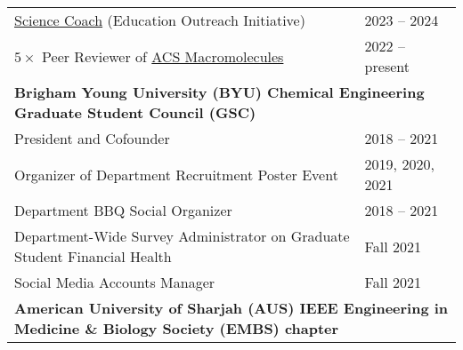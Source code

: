 \documentclass[letterpaper,11pt]{article}
\begin{document}
\begin{longtable}{@{}p{}l@{}}
  \hspace{3mm} \href{https://www.acs.org/education/outreach/science-coaches.html}{Science Coach} (Education Outreach Initiative)                                                                                  & 2023 -- 2024     \\
  \hspace{3mm} $5\times$ Peer Reviewer of \href{https://pubs.acs.org/journal/mamobx}{ACS Macromolecules}                                                                                                          & 2022 -- present  \\ [4pt]
  \multicolumn{2}{l}{\hspace{-3mm} \bf{Brigham Young University (BYU) Chemical Engineering Graduate Student Council (GSC)}}                                                                                                          \\
  \hspace{3mm} President and Cofounder                                                                                                                                                                            & 2018 -- 2021     \\
  \hspace{3mm} Organizer of Department Recruitment Poster Event                                                                                                                                                   & 2019, 2020, 2021 \\
  \hspace{3mm} Department BBQ Social Organizer                                                                                                                                                                    & 2018 -- 2021     \\
  \hspace{3mm} Department-Wide Survey Administrator on Graduate Student Financial Health                                                                                                                          & Fall 2021        \\
  \hspace{3mm} Social Media Accounts Manager                                                                                                                                                                      & Fall 2021        \\ [4pt]
  \multicolumn{2}{l}{\hspace{-3mm} \bf{American University of Sharjah (AUS) IEEE Engineering in Medicine \& Biology Society (EMBS) chapter}}                                                                                         \\

\end{longtable}
\end{document}
